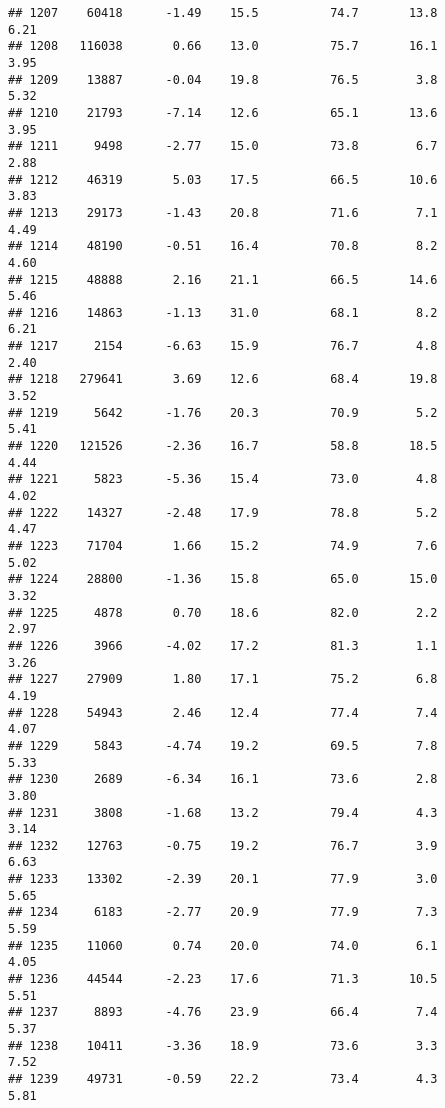 \documentclass[
]{article}
\begin{document}
\begin{verbatim}
## 1207    60418      -1.49    15.5          74.7       13.8              6.21
## 1208   116038       0.66    13.0          75.7       16.1              3.95
## 1209    13887      -0.04    19.8          76.5        3.8              5.32
## 1210    21793      -7.14    12.6          65.1       13.6              3.95
## 1211     9498      -2.77    15.0          73.8        6.7              2.88
## 1212    46319       5.03    17.5          66.5       10.6              3.83
## 1213    29173      -1.43    20.8          71.6        7.1              4.49
## 1214    48190      -0.51    16.4          70.8        8.2              4.60
## 1215    48888       2.16    21.1          66.5       14.6              5.46
## 1216    14863      -1.13    31.0          68.1        8.2              6.21
## 1217     2154      -6.63    15.9          76.7        4.8              2.40
## 1218   279641       3.69    12.6          68.4       19.8              3.52
## 1219     5642      -1.76    20.3          70.9        5.2              5.41
## 1220   121526      -2.36    16.7          58.8       18.5              4.44
## 1221     5823      -5.36    15.4          73.0        4.8              4.02
## 1222    14327      -2.48    17.9          78.8        5.2              4.47
## 1223    71704       1.66    15.2          74.9        7.6              5.02
## 1224    28800      -1.36    15.8          65.0       15.0              3.32
## 1225     4878       0.70    18.6          82.0        2.2              2.97
## 1226     3966      -4.02    17.2          81.3        1.1              3.26
## 1227    27909       1.80    17.1          75.2        6.8              4.19
## 1228    54943       2.46    12.4          77.4        7.4              4.07
## 1229     5843      -4.74    19.2          69.5        7.8              5.33
## 1230     2689      -6.34    16.1          73.6        2.8              3.80
## 1231     3808      -1.68    13.2          79.4        4.3              3.14
## 1232    12763      -0.75    19.2          76.7        3.9              6.63
## 1233    13302      -2.39    20.1          77.9        3.0              5.65
## 1234     6183      -2.77    20.9          77.9        7.3              5.59
## 1235    11060       0.74    20.0          74.0        6.1              4.05
## 1236    44544      -2.23    17.6          71.3       10.5              5.51
## 1237     8893      -4.76    23.9          66.4        7.4              5.37
## 1238    10411      -3.36    18.9          73.6        3.3              7.52
## 1239    49731      -0.59    22.2          73.4        4.3              5.81

\end{verbatim}
\end{document}
